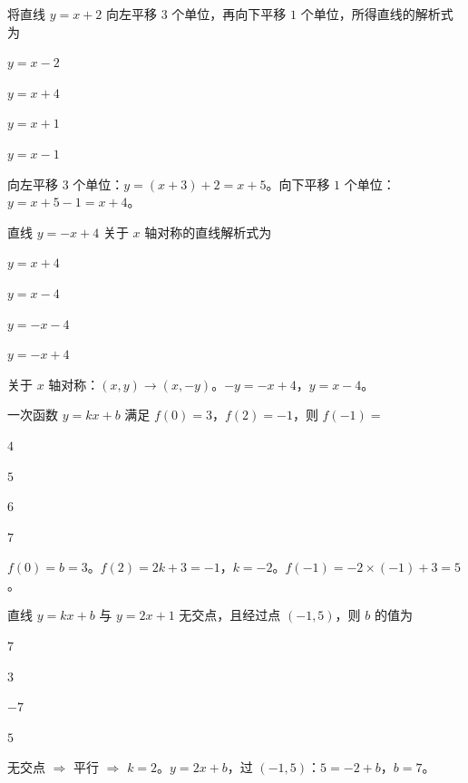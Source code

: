 \documentclass{exam-zh}
\begin{document}
\begin{question}[points=5]
  将直线 $y = x + 2$ 向左平移 $3$ 个单位，再向下平移 $1$ 个单位，所得直线的解析式为
  \begin{choices}
    \item $y = x - 2$
    \item $y = x + 4$
    \item $y = x + 1$
    \item $y = x - 1$
  \end{choices}
  \paren[B]
  \begin{solutionblock}
    向左平移 $3$ 个单位：$y = (x + 3) + 2 = x + 5$。向下平移 $1$ 个单位：$y = x + 5 - 1 = x + 4$。
  \end{solutionblock}
\end{question}



\begin{question}[points=5]
  直线 $y = -x + 4$ 关于 $x$ 轴对称的直线解析式为
  \begin{choices}
    \item $y = x + 4$
    \item $y = x - 4$
    \item $y = -x - 4$
    \item $y = -x + 4$
  \end{choices}
  \paren[B]
  \begin{solutionblock}
    关于 $x$ 轴对称：$(x, y) \to (x, -y)$。$-y = -x + 4$，$y = x - 4$。
  \end{solutionblock}
\end{question}



\begin{question}[points=5]
  一次函数 $y = kx + b$ 满足 $f(0) = 3$，$f(2) = -1$，则 $f(-1) = $
  \begin{choices}
    \item $4$
    \item $5$
    \item $6$
    \item $7$
  \end{choices}
  \paren[B]
  \begin{solutionblock}
    $f(0) = b = 3$。$f(2) = 2k + 3 = -1$，$k = -2$。$f(-1) = -2 \times (-1) + 3 = 5$。
  \end{solutionblock}
\end{question}



\begin{question}[points=5]
  直线 $y = kx + b$ 与 $y = 2x + 1$ 无交点，且经过点 $(-1, 5)$，则 $b$ 的值为
  \begin{choices}
    \item $7$
    \item $3$
    \item $-7$
    \item $5$
  \end{choices}
  \paren[A]
  \begin{solutionblock}
    无交点 $\Rightarrow$ 平行 $\Rightarrow$ $k = 2$。$y = 2x + b$，过 $(-1, 5)$：$5 = -2 + b$，$b = 7$。
  \end{solutionblock}
\end{question}
\end{document}
